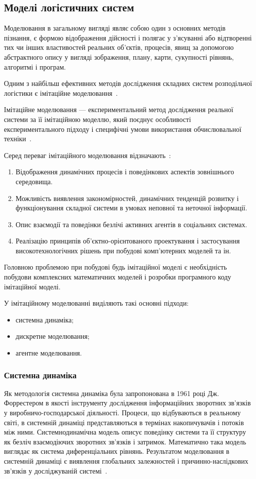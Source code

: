 \subsection{Моделі логістичних систем}
Моделювання в загальному вигляді являє собою один з основних методів пізнання, є формою відображення дійсності і полягає у з'ясуванні або відтворенні тих чи інших властивостей реальних об'єктів, процесів, явищ за допомогою абстрактного опису у вигляді зображення, плану, карти, сукупності рівнянь, алгоритмі і програм.

Одним з найбільш ефективних методів дослідження складних систем розподільчої логістики є імітаційне моделювання~\cite{Kobelev2003}.

Імітаційне моделювання --- експериментальний метод дослідження реальної системи за її імітаційною моделлю, який поєднує особливості експериментального підходу і специфічні умови використання обчислювальної техніки~\cite{Emelyanov2002}.

Серед переваг імітаційного моделювання відзначають~\cite{Emelyanov2002}: 
\begin{enumerate}
	\item Відображення динамічних процесів і поведінкових аспектів зовнішнього середовища.
	\item Можливість виявлення закономірностей, динамічних тенденцій розвитку і функціонування складної системи в умовах неповної та неточної інформації.
	\item Опис взаємодії та поведінки безлічі активних агентів в соціальних системах.
	\item Реалізацію принципів об'єктно-орієнтованого проектування і застосування високотехнологічних рішень при побудові комп'ютерних моделей та ін.
\end{enumerate}

Головною проблемою при побудові будь імітаційної моделі є необхідність побудови комплексних математичних моделей і розробки програмного коду імітаційної моделі. 

У імітаційному моделюванні виділяють такі основні підходи:
\begin{itemize}
	\item системна динаміка;
	\item дискретне моделювання;
	\item агентне моделювання.
\end{itemize}

\subsubsection{Системна динаміка}
Як методологія системна динаміка була запропонована в 1961 році Дж. Форрестером в якості інструменту дослідження інформаційних зворотних зв'язків у виробничо-господарської діяльності. 
Процеси, що відбуваються в реальному світі, в системній динаміці представляються в термінах накопичувачів і потоків між ними.
Системнодинамічна модель описує поведінку системи та її структуру як безліч взаємодіючих зворотних зв'язків і затримок. 
Математично така модель виглядає як система диференціальних рівнянь. 
Результатом моделювання в системній динаміці є виявлення глобальних залежностей і причинно-наслідкових зв'язків у досліджуваній системі~\cite{Shamrin2016}. 

